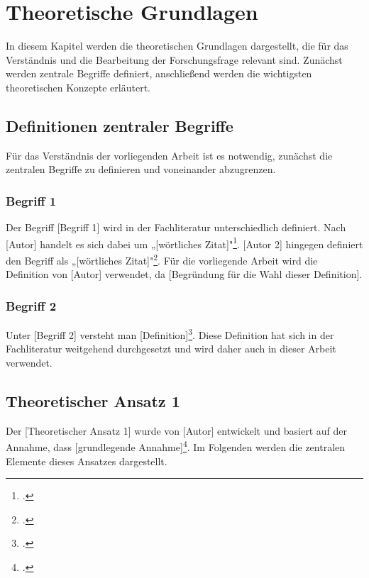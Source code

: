 \chapter{Theoretische Grundlagen}
\label{chap:theoretische_grundlagen}

In diesem Kapitel werden die theoretischen Grundlagen dargestellt, die für das Verständnis und die Bearbeitung der Forschungsfrage relevant sind. Zunächst werden zentrale Begriffe definiert, anschließend werden die wichtigsten theoretischen Konzepte erläutert.

\section{Definitionen zentraler Begriffe}
\label{sec:definitionen}

Für das Verständnis der vorliegenden Arbeit ist es notwendig, zunächst die zentralen Begriffe zu definieren und voneinander abzugrenzen.

\subsection{Begriff 1}
\label{subsec:begriff1}

Der Begriff [Begriff 1] wird in der Fachliteratur unterschiedlich definiert. Nach [Autor] handelt es sich dabei um „[wörtliches Zitat]"\footcite[S. XX]{Quelle1}. [Autor 2] hingegen definiert den Begriff als „[wörtliches Zitat]"\footcite[S. XX]{Quelle2}. Für die vorliegende Arbeit wird die Definition von [Autor] verwendet, da [Begründung für die Wahl dieser Definition].

\subsection{Begriff 2}
\label{subsec:begriff2}

Unter [Begriff 2] versteht man [Definition]\footcite[S. XX]{Quelle3}. Diese Definition hat sich in der Fachliteratur weitgehend durchgesetzt und wird daher auch in dieser Arbeit verwendet.

\section{Theoretischer Ansatz 1}
\label{sec:theoretischer_ansatz1}

Der [Theoretischer Ansatz 1] wurde von [Autor] entwickelt und basiert auf der Annahme, dass [grundlegende Annahme]\footcite[S. XX]{Quelle4}. Im Folgenden werden die zentralen Elemente dieses Ansatzes dargestellt.

